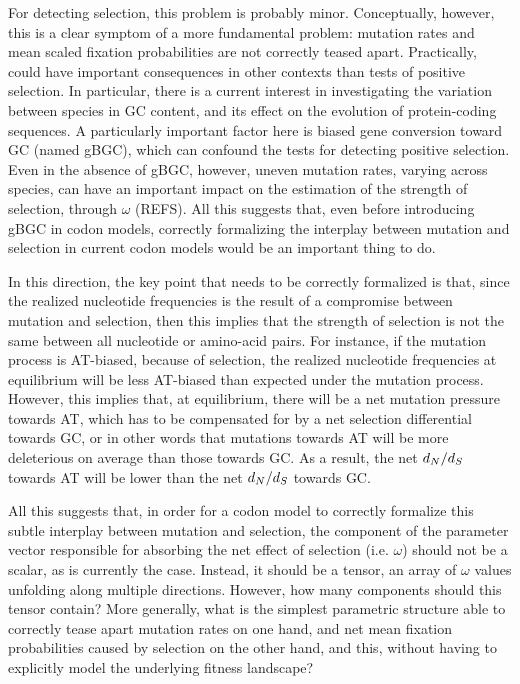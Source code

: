 For detecting selection, this problem is probably minor.
Conceptually, however, this is a clear symptom of a more fundamental problem: mutation rates and mean scaled fixation probabilities are not correctly teased apart.
Practically, could have important consequences in other contexts than tests of positive selection.
In particular, there is a current interest in investigating the variation between species in GC content, and its effect on the evolution of protein-coding sequences.
A particularly important factor here is biased gene conversion toward GC (named gBGC), which can confound the tests for detecting positive selection.
Even in the absence of gBGC, however, uneven mutation rates, varying across species, can have an important impact on the estimation of the strength of selection, through $\omega$ (REFS).
All this suggests that, even before introducing gBGC in codon models, correctly formalizing the interplay between mutation and selection in current codon models would be an important thing to do.

In this direction, the key point that needs to be correctly formalized is that, since the realized nucleotide frequencies is the result of a compromise between mutation and selection, then this implies that the strength of selection is not the same between all nucleotide or amino-acid pairs.
For instance, if the mutation process is AT-biased, because of selection, the realized nucleotide frequencies at equilibrium will be less AT-biased than expected under the mutation process.
However, this implies that, at equilibrium, there will be a net mutation pressure towards AT, which has to be compensated for by a net selection differential towards GC, or in other words that mutations towards AT will be more deleterious on average than those towards GC.
As a result, the net $d_N / d_S$ towards AT will be lower than the net $d_N / d_S$ towards GC.

All this suggests that, in order for a codon model to correctly formalize this subtle interplay between mutation and selection, the component of the parameter vector responsible for absorbing the net effect of selection (i.e. $\omega$) should not be a scalar, as is currently the case.
Instead, it should be a tensor, an array of $\omega$ values unfolding along multiple directions.
However, how many components should this tensor contain?
More generally, what is the simplest parametric structure able to correctly tease apart mutation rates on one hand, and net mean fixation probabilities caused by selection on the other hand, and this, without having to explicitly model the underlying fitness landscape?

